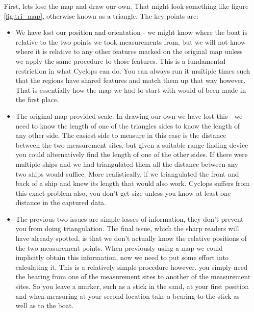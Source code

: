 \documentclass[10pt,a4paper,twoside]{article}
\begin{document}
First, lets lose the map and draw our own.
That might look something like figure \ref{fig:tri_map}, otherwise known as a triangle.
The key points are:
\begin{itemize}
\item We have lost our position and orientation - we might know where the boat is relative to the two points we took measurements from, but we will not know where it is relative to any other features marked on the original map unless we apply the same procedure to those features. This is a fundamental restriction in what Cyclops can do. You can always run it multiple times such that the regions have shared features and match them up that way however. That is essentially how the map we had to start with would of been made in the first place.
\item The original map provided scale. In drawing our own we have lost this - we need to know the length of one of the triangles sides to know the length of any other side. The easiest side to measure in this case is the distance between the two measurement sites, but given a suitable range-finding device you could alternatively find the length of one of the other sides. If there were multiple ships and we had triangulated them all the distance between any two ships would suffice. More realistically, if we triangulated the front and back of a ship and knew its length that would also work. Cyclops suffers from this exact problem also, you don't get size unless you know at least one distance in the captured data.
\item The previous two issues are simple losses of information, they don't prevent you from doing triangulation. The final issue, which the sharp readers will have already spotted, is that we don't actually know the relative positions of the two measurement points. When previously using a map we could implicitly obtain this information, now we need to put some effort into calculating it. This is a relatively simple procedure however, you simply need the bearing from one of the measurement sites to another of the measurement sites. So you leave a marker, such as a stick in the sand, at your first position and when measuring at your second location take a bearing to the stick as well as to the boat.
\end{itemize}
\end{document}
